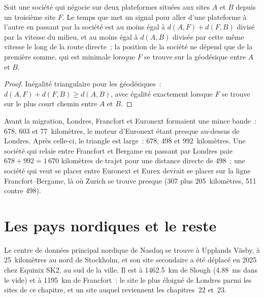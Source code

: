 \label{lst:nw:the-european-map:move}

\begin{proposition}\label{prop:nw:the-european-map:triangle}
Soit une société qui négocie sur deux plateformes situées aux sites $A$ et $B$ depuis un troisième site $F$. Le temps que met un signal pour aller d'une plateforme à l'autre en passant par la
société est au moins égal à $d(A,F) + d(F,B)$ divisé par la vitesse du milieu, et au moins égal à $d(A,B)$ divisée par cette même vitesse le long de la route directe~; la
position de la société ne dépend que de la première somme, qui est minimale lorsque $F$ se trouve sur la géodésique entre $A$ et $B$.
\end{proposition}

\begin{proof}
Inégalité triangulaire pour les géodésiques~: $d(A,F) + d(F,B) \ge d(A,B)$, avec égalité exactement lorsque $F$ se trouve sur le plus court chemin entre $A$ et
$B$.
\end{proof}

Avant la migration, Londres, Francfort et Euronext formaient une mince bande~: 678, 603 et 77~kilomètres, le moteur d'Euronext étant presque au-dessus de
Londres. Après celle-ci, le triangle est large~: 678, 498 et 992~kilomètres. Une société qui relaie entre Francfort et Bergame en passant par Londres paie
$678 + 992 = 1\,670$ kilomètres de trajet pour une distance directe de 498~; une société qui veut se placer entre Euronext et Eurex devrait se placer sur la
ligne Francfort--Bergame, là où Zurich se trouve presque (307 plus 205~kilomètres, 511 contre 498).

\section{Les pays nordiques et le reste}

Le centre de données principal nordique de Nasdaq se trouve à Upplands Väsby, à 25~kilomètres au nord de Stockholm, et son site secondaire a été déplacé en 2025 chez Equinix
SK2, au sud de la ville. Il est à \qty{1462.5}{\kilo\metre} de Slough (\qty{4.88}{\milli\second} dans le vide) et à \qty{1195}{\kilo\metre} de
Francfort~: le site le plus éloigné de Londres parmi les sites de ce chapitre, et un site auquel reviennent les chapitres~22 et~23.

